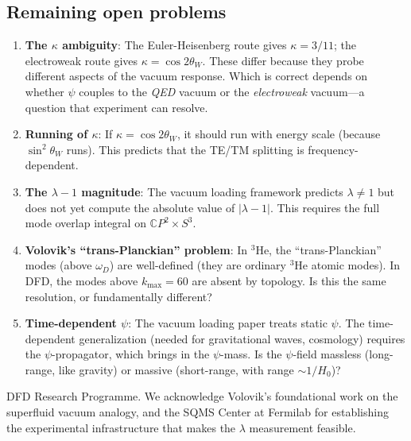 \documentclass[aps,prd,twocolumn,superscriptaddress,nofootinbib]{revtex4-2}
\newcommand{\CP}{\mathbb{C}P}
\begin{document}
\subsection{Remaining open problems}

\begin{enumerate}
\item \textbf{The $\kappa$ ambiguity}: The Euler-Heisenberg route
  gives $\kappa = 3/11$; the electroweak route gives $\kappa =
  \cos 2\theta_W$.  These differ because they probe different
  aspects of the vacuum response.  Which is correct depends on
  whether $\psi$ couples to the \emph{QED} vacuum or the
  \emph{electroweak} vacuum---a question that experiment can
  resolve.
\item \textbf{Running of $\kappa$}: If $\kappa = \cos 2\theta_W$,
  it should run with energy scale (because $\sin^2\theta_W$ runs).
  This predicts that the TE/TM splitting is frequency-dependent.
\item \textbf{The $\lambda - 1$ magnitude}: The vacuum loading
  framework predicts $\lambda \neq 1$ but does not yet compute
  the absolute value of $|\lambda - 1|$.  This requires the full
  mode overlap integral on $\CP^2 \times S^3$.
\item \textbf{Volovik's ``trans-Planckian'' problem}: In $^3$He,
  the ``trans-Planckian'' modes (above $\omega_D$) are well-defined
  (they are ordinary $^3$He atomic modes).  In DFD, the modes above
  $k_{\max} = 60$ are absent by topology.  Is this the same
  resolution, or fundamentally different?
\item \textbf{Time-dependent $\psi$}: The vacuum loading paper
  treats static $\psi$.  The time-dependent generalization (needed
  for gravitational waves, cosmology) requires the $\psi$-propagator,
  which brings in the $\psi$-mass.  Is the $\psi$-field massless
  (long-range, like gravity) or massive (short-range, with range
  $\sim 1/H_0$)?
\end{enumerate}


\begin{acknowledgments}
DFD Research Programme.  We acknowledge Volovik's foundational
work on the superfluid vacuum analogy, and the SQMS Center at
Fermilab for establishing the experimental infrastructure that
makes the $\lambda$ measurement feasible.
\end{acknowledgments}
\end{document}

